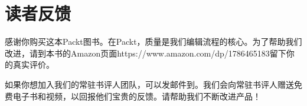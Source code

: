 
\section*{读者反馈}



感谢你购买这本Packt图书。在Packt，质量是我们编辑流程的核心。为了帮助我们改进，请到本书的Amazon页面https://\allowbreak{}www.\allowbreak{}amazon.\allowbreak{}com/\allowbreak{}dp/\allowbreak{}1786465183留下你的真实评价。



如果你想加入我们的常驻书评人团队，可以发邮件到。我们会向常驻书评人赠送免费电子书和视频，以回报他们宝贵的反馈。请帮助我们不断改进产品！
